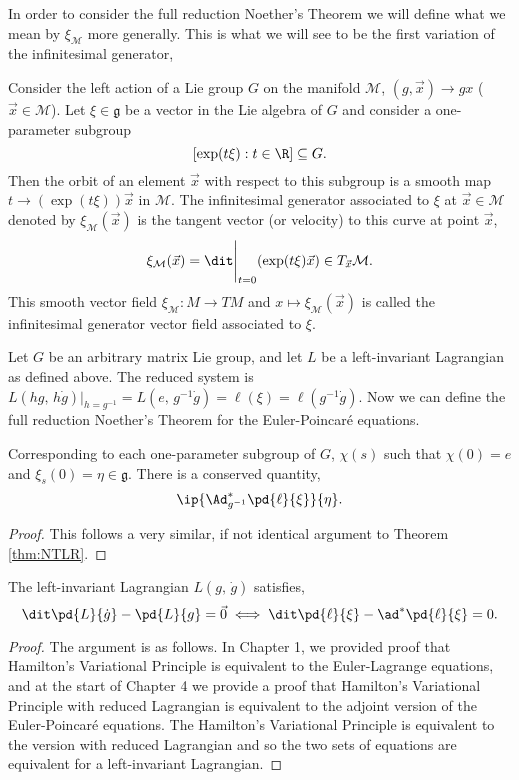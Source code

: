 \noindent
In order to consider the full reduction Noether's Theorem we will define what we mean by $\xi_\mathcal{M}$ more generally. This is what we will see to be the first variation of the infinitesimal generator,
\begin{ndefi}
  Consider the left action of a Lie group $G$ on the manifold $\mathcal{M}$, $(g, \vec x) \to gx$ ($\vec x \in \mathcal{M}$). Let $\xi \in \mathfrak{g}$ be a vector in the Lie algebra of $G$ and consider a one-parameter subgroup $$[\exp(t\xi) : t \in \R] \subseteq G.$$
  Then the orbit of an element $\vec x$ with respect to this subgroup is a smooth map $t \to (\exp(t\xi))\vec x$ in $\mathcal{M}$. The infinitesimal generator associated to $\xi$ at $\vec x \in \mathcal{M}$ denoted by $\xi_{\mathcal{M}}(\vec x)$ is the tangent vector (or velocity) to this curve at point $\vec x$,
  $$ \xi_{\mathcal{M}} (\vec x) = \dit\Bigg|_{t=0} (\exp(t \xi)\vec x) \in T_{\vec x}\mathcal{M}. $$
  This smooth vector field $\xi_{\mathcal{M}} : M \to TM$ and $x \mapsto \xi_{\mathcal{M}}(\vec x)$ is called the infinitesimal generator vector field associated to $\xi$.
\end{ndefi}

\noindent
Let $G$ be an arbitrary matrix Lie group, and let $L$ be a left-invariant Lagrangian as defined above. The reduced system is $L(hg,\, h\dot g)|_{h = g^{-1}} = L(e,\,g^{-1}\dot g) = \ell(\xi) = \ell(g^{-1}\dot g)$. Now we can define the full reduction Noether's Theorem for the Euler-Poincar\'e equations.
\begin{nthm}
  Corresponding to each one-parameter subgroup of $G$, $\chi(s)$ such that $\chi(0) = e$ and $\xi_s(0) = \eta \in \mathfrak{g}$. There is a conserved quantity,
  $$ \ip{\Ad^*_{g^{-1}} \pd{\ell}{\xi}}{\eta}. $$
\end{nthm}
\begin{proof}
  This follows a very similar, if not identical argument to Theorem \ref{thm:NTLR}.
\end{proof}

\begin{nprop}
  The left-invariant Lagrangian $L(g,\,\dot g)$ satisfies,
  $$ \dit\pd{L}{\dot g} - \pd{L}{g} = \vec 0  \iff \dit\pd{\ell}{\xi} - \ad^*\pd{\ell}{\xi} = 0. $$
\end{nprop}
\begin{proof}
  The argument is as follows. In Chapter 1, we provided proof that Hamilton's Variational Principle is equivalent to the Euler-Lagrange equations, and at the start of Chapter 4 we provide a proof that Hamilton's Variational Principle with reduced Lagrangian is equivalent to the adjoint version of the Euler-Poincar\'e equations. The Hamilton's Variational Principle is equivalent to the version with reduced Lagrangian and so the two sets of equations are equivalent for a left-invariant Lagrangian.
\end{proof}

